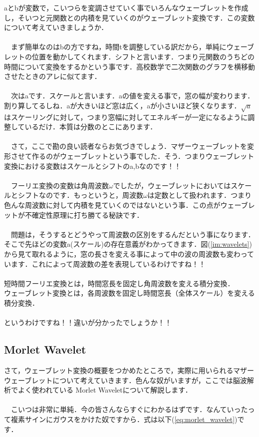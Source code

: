 \documentclass[11pt,a4paper,uplatex]{ujreport} 	%
\begin{document}
aとbが変数で，こいつらを変調させていく事でいろんなウェーブレットを作成し，そいつと元関数との内積を見ていくのがウェーブレット変換です．この変数について考えていきましょうか．\\
\\
　まず簡単なのはbの方ですね，時間tを調整している訳だから，単純にウェーブレットの位置を動かしてくれます．シフトと言います．つまり元関数のうちどの時間について変換をするかという事です．高校数学で二次関数のグラフを横移動させたときのアレに似てます．\\
\\
　次はaです．スケールと言います．aの値を変える事で，窓の幅が変わります．割り算してるしね．aが大きいほど窓は広く，aが小さいほど狭くなります．$\sqrt{a}$はスケーリングに対して，つまり窓幅に対してエネルギーが一定になるように調整しているだけ．本質は分数のとこにあります．\\
\\
　さて，ここで勘の良い読者ならお気づきでしょう．マザーウェーブレットを変形させて作るのがウェーブレットという事でした．そう．つまりウェーブレット変換における変数はスケールとシフトのa,bなのです！！\\
\\
　フーリエ変換の変数は角周波数$\omega$でしたが，ウェーブレットにおいてはスケールとシフトなのです．もっというと，周波数$\omega$は定数として扱われます．つまり色んな周波数に対して内積を見ていくのではないという事．この点がウェーブレットが不確定性原理に打ち勝てる秘訣です．\\
\\
　問題は，そうするとどうやって周波数の区別をするんだという事になります．そこで先ほどの変数a(スケール)の存在意義がわかってきます．図(\ref{im:wavelets})から見て取れるように，窓の長さを変える事によって中の波の周波数も変わっています．これによって周波数の差を表現しているわけですね！！\\
\\
短時間フーリエ変換とは，時間窓長を固定し角周波数を変える積分変換．\\
ウェーブレット変換とは，各周波数を固定し時間窓長（全体スケール）を変える積分変換．\\
\\
というわけですね！！違いが分かったでしょうか！！\\

\subsection{Morlet Wavelet}
さて，ウェーブレット変換の概要をつかめたところで，実際に用いられるマザーウェーブレットについて考えていきます．色んな奴がいますが，ここでは脳波解析でよく使われている Morlet Waveletについて解説します．\\
\\
　こいつは非常に単純．今の皆さんならすぐにわかるはずです．なんていったって複素サインにガウスをかけた奴ですから．式は以下(\ref{eq:morlet_wavelet})です．
\end{document}
